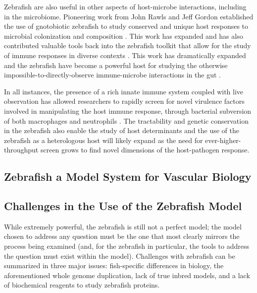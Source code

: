 Zebrafish are also useful in other aspects of host-microbe interactions, including in the microbiome. Pioneering work from John Rawls and Jeff Gordon established the use of gnotobiotic zebrafish to study conserved and unique host responses to microbial colonization and composition \citep{Rawls2004, Rawls2006}. This work has expanded and has also contributed valuable tools back into the zebrafish toolkit that allow for the study of immune responses in diverse contexts \citep{Kanther2011}. This work has dramatically expanded and the zebrafish have become a powerful host for studying the otherwise impossible-to-directly-observe immune-microbe interactions in the gut \citep{Park2019, Murdoch2019a, Murdoch2019b, Espenschied2019}.

In all instances, the presence of a rich innate immune system coupled with live observation has allowed researchers to rapidly screen for novel virulence factors involved in manipulating the host immune response, through bacterial subversion of both macrophages and neutrophils \citep{Torraca2018}. The tractability and genetic conservation in the zebrafish also enable the study of host determinants and the use of the zebrafish as a heterologous host will likely expand as the need for ever-higher-throughput screen grows to find novel dimensions of the host-pathogen response.

\citep{Gratacap2014}
\citep{Sullivan2017}
\citep{Masud2017}

\subsection{Zebrafish a Model System for Vascular Biology}

\citep{Ellertsdottir2010}
\citep{Gore2012}
\citep{Hogan2017}
\citep{Vogeli2006}
\citep{Liang2001}
\citep{Nasevicius2000}
\citep{Schuermann2014}

\subsection{Challenges in the Use of the Zebrafish Model}

While extremely powerful, the zebrafish is still not a perfect model; the model chosen to address any question must be the one that most clearly mirrors the process being examined (and, for the zebrafish in particular, the tools to address the question must exist within the model). Challenges with zebrafish can be summarized in three major issues: fish-specific differences in biology, the aforementioned whole genome duplication, lack of true inbred models, and a lack of biochemical reagents to study zebrafish proteins.

